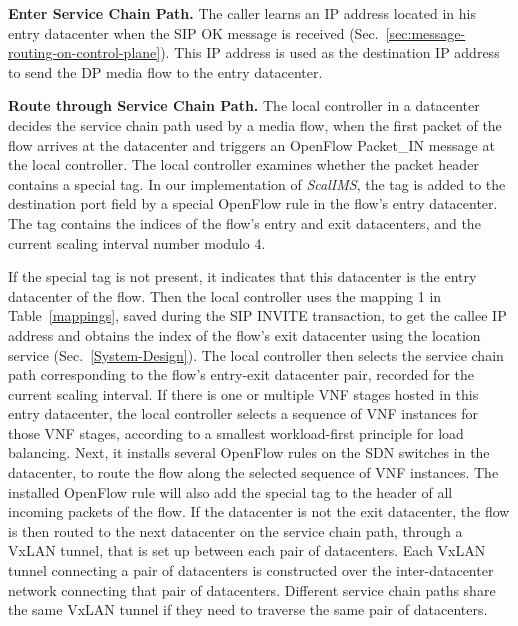 \vspace{1mm}
\noindent\textbf{Enter Service Chain Path.}
The caller learns an IP address located in his entry datacenter %
when the SIP OK message is received (Sec.~\ref{sec:message-routing-on-control-plane}). This IP address is used as the destination IP address to send the DP media flow to the entry datacenter. %

\vspace{1mm}
\noindent\textbf{Route through Service Chain Path.}
The local controller in a datacenter decides the service chain path used by a media flow, when the first packet of the flow arrives at the datacenter and triggers an OpenFlow Packet\_IN message at the local controller. The local controller examines whether the packet header contains a special tag. In our implementation of \textit{ScalIMS}, the tag is added to the destination port field by a special OpenFlow rule in the flow's entry datacenter. The tag contains the indices of the flow's entry and exit datacenters, and the current scaling interval number modulo 4. %

If the special tag is not present, it indicates that %
 this datacenter is the entry datacenter of the flow. Then the local controller uses the mapping 1 in Table~\ref{mappings}, saved during the SIP INVITE transaction, to get the callee IP address %
 and obtains the index of the flow's exit datacenter using the location service (Sec.~\ref{System-Design}). The local controller then selects the service chain path corresponding to the flow's entry-exit datacenter pair, recorded for the current scaling interval.  %
 If there is one or multiple VNF stages hosted in this entry datacenter, the local controller selects a sequence of VNF instances for those VNF stages, according to a smallest workload-first principle for load balancing. Next, it installs several OpenFlow rules on the SDN switches in the datacenter, to route the flow along the selected sequence of VNF instances. The installed OpenFlow rule will also add the special tag to the header of all incoming packets of the flow. %
 If the datacenter is not the exit datacenter, the flow is then routed to the next datacenter on the service chain path, through a VxLAN tunnel, that is set up between each pair of datacenters. Each VxLAN tunnel connecting a pair of datacenters is constructed over the inter-datacenter network connecting that pair of datacenters. Different service chain paths share the same VxLAN tunnel if they need to traverse the same pair of datacenters.


